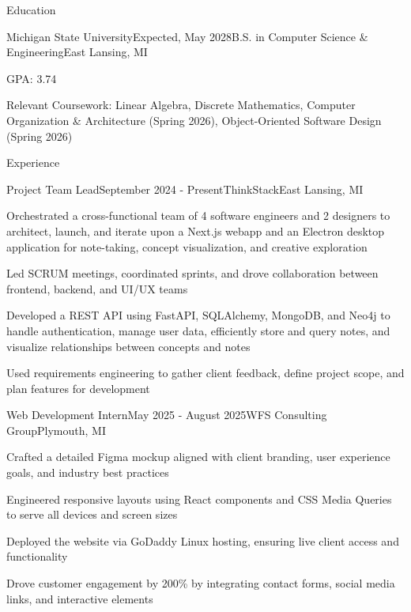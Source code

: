 \documentclass[
	11pt
]{resume}
\begin{document}
	\begin{rSection}{E}{ducation}
		\begin{rSectionEntry}{Michigan State University}{Expected, May 2028}{B.S. in Computer Science \& Engineering}{East Lansing, MI}
			\item GPA: 3.74
			\item Relevant Coursework: Linear Algebra, Discrete Mathematics, Computer Organization \& Architecture (Spring 2026), Object-Oriented Software Design (Spring 2026)
		\end{rSectionEntry}
	\end{rSection}

	\begin{rSection}{E}{xperience}
		\begin{rSectionEntry}{Project Team Lead}{September 2024 - Present}{ThinkStack}{East Lansing, MI}
			\item Orchestrated a cross-functional team of 4 software engineers and 2 designers to architect, launch, and iterate upon a Next.js webapp and an Electron desktop application for note-taking, concept visualization, and creative exploration
			\item Led SCRUM meetings, coordinated sprints, and drove collaboration between frontend, backend, and UI/UX teams
			\item Developed a REST API using FastAPI, SQLAlchemy, MongoDB, and Neo4j to handle authentication, manage user data, efficiently store and query notes, and visualize relationships between concepts and notes
			\item Used requirements engineering to gather client feedback, define project scope, and plan features for development
		\end{rSectionEntry}

		\begin{rSectionEntry}{Web Development Intern}{May 2025 - August 2025}{WFS Consulting Group}{Plymouth, MI}
			\item Crafted a detailed Figma mockup aligned with client branding, user experience goals, and industry best practices
			\item Engineered responsive layouts using React components and CSS Media Queries to serve all devices and screen sizes
			\item Deployed the website via GoDaddy Linux hosting, ensuring live client access and functionality
			\item Drove customer engagement by 200\% by integrating contact forms, social media links, and interactive elements
		\end{rSectionEntry}
	\end{rSection}
\end{document}
